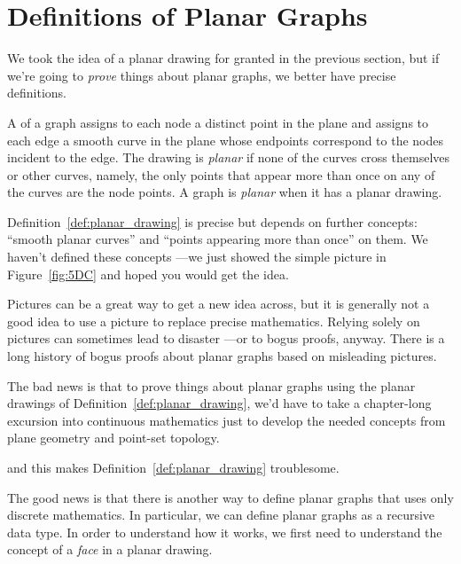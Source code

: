 \section{Definitions of Planar Graphs}\label{sec:recdef_planar}

We took the idea of a planar drawing for granted in the previous
section, but if we're going to \emph{prove} things about planar graphs, we
better have precise definitions.

\begin{definition}\label{def:planar_drawing}
A  of a graph assigns to each node a distinct point in
the plane and assigns to each edge a smooth curve in the plane whose
endpoints correspond to the nodes incident to the edge.  The drawing
is \emph{planar} if none of the curves
cross themselves or other curves, namely, the only points that
appear more than once on any of the curves are the node points.  A
graph is \emph{planar} when it has a planar
drawing.
\end{definition}

Definition~\ref{def:planar_drawing} is precise but depends on
further concepts: ``smooth planar curves'' and ``points appearing more
than once'' on them.  We haven't defined these concepts ---we just
showed the simple picture in Figure~\ref{fig:5DC} and hoped you would
get the idea.

Pictures can be a great way to get a new idea across, but it is generally
not a good idea to use a picture to replace precise mathematics.  Relying
solely on pictures can sometimes lead to disaster ---or to bogus proofs,
anyway.  There is a long history of bogus proofs about planar graphs based
on misleading pictures.\iffalse
\footnote{The bogus proof of the
  4-Color Theorem for planar graphs is not the only example.  Mistakes
  creep in with statements like,
\begin{quote}
    As you can see from Figure~ABC, it must be that property~XYZ holds
    for all planar graphs.
\end{quote}}\fi

The bad news is that to prove things about planar graphs using the
planar drawings of Definition~\ref{def:planar_drawing}, we'd have to
take a chapter-long excursion into continuous mathematics just to
develop the needed concepts from plane geometry and point-set topology.
\begin{editingnotes} and this makes
  Definition~\ref{def:planar_drawing} troublesome.
\end{editingnotes}
The good news is that there is another way to define planar graphs that
uses only discrete mathematics.  In particular, we can define planar
graphs as a recursive data type.  In order to understand how it works, we
first need to understand the concept of a \emph{face} in a planar drawing.

